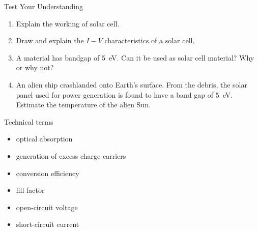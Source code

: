 %
\begin{frame}[label=pre-M2T1-slot2]{Test Your Understanding}
	\begin{enumerate}
		\item Explain the working of solar cell.
		\item Draw and explain the \(I - V\) characteristics of a solar cell.
		\item A material has bandgap of \SI{5}{\electronvolt}. Can it be used as solar cell material? Why or why not?
		\item An alien ship crashlanded onto Earth's surface. From the debris, the solar panel used for power generation is found to have a band gap of \SI{5}{\electronvolt}. Estimate the temperature of the alien Sun.
	\end{enumerate}
\end{frame}
%
\begin{frame}[label=pre-M2T1-slot2]{Technical terms}
	\begin{itemize}
		\item optical absorption
		\item generation of excess charge carriers
		\item conversion efficiency
		\item fill factor
		\item open-circuit voltage
		\item short-circuit current
	\end{itemize}
\end{frame}
%